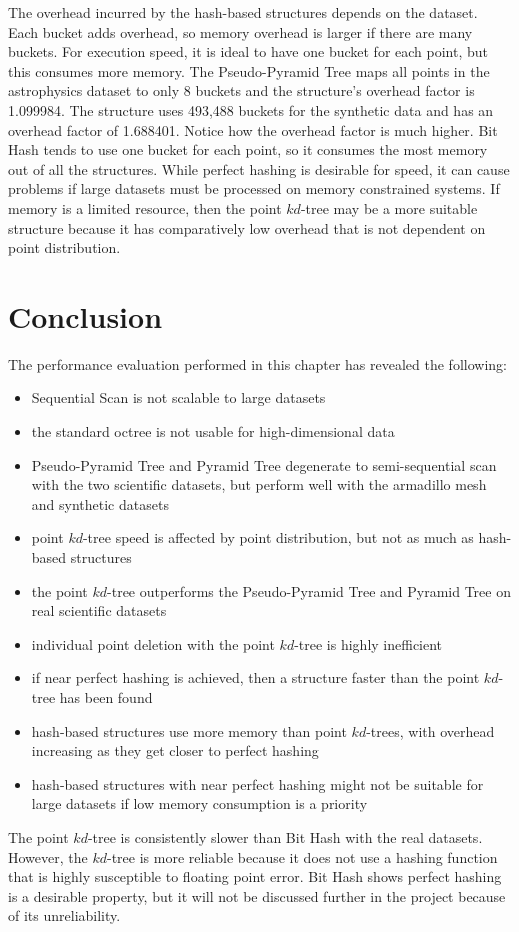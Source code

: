 The overhead incurred by the hash-based structures depends on the dataset. Each bucket adds overhead, so memory overhead is larger if there are many buckets. For execution speed, it is ideal to have one bucket for each point, but this consumes more memory. The Pseudo-Pyramid Tree maps all points in the astrophysics dataset to only 8 buckets and the structure's overhead factor is 1.099984. The structure uses 493,488 buckets for the synthetic data and has an overhead factor of 1.688401. Notice how the overhead factor is much higher. Bit Hash tends to use one bucket for each point, so it consumes the most memory out of all the structures. While perfect hashing is desirable for speed, it can cause problems if large datasets must be processed on memory constrained systems. If memory is a limited resource, then the point $kd$-tree may be a more suitable structure because it has comparatively low overhead that is not dependent on point distribution.

\section{Conclusion}

The performance evaluation performed in this chapter has revealed the following:
\begin{itemize}
	\item Sequential Scan is not scalable to large datasets
	\item the standard octree is not usable for high-dimensional data
	\item Pseudo-Pyramid Tree and Pyramid Tree degenerate to semi-sequential scan with the two scientific datasets, but perform well with the armadillo mesh and synthetic datasets
	\item point $kd$-tree speed is affected by point distribution, but not as much as hash-based structures
	\item the point $kd$-tree outperforms the Pseudo-Pyramid Tree and Pyramid Tree on real scientific datasets
	\item individual point deletion with the point $kd$-tree is highly inefficient
	\item if near perfect hashing is achieved, then a structure faster than the point $kd$-tree has been found
	\item hash-based structures use more memory than point $kd$-trees, with overhead increasing as they get closer to perfect hashing
	\item hash-based structures with near perfect hashing might not be suitable for large datasets if low memory consumption is a priority
\end{itemize}

The point $kd$-tree is consistently slower than Bit Hash with the real datasets. However, the $kd$-tree is more reliable because it does not use a hashing function that is highly susceptible to floating point error. Bit Hash shows perfect hashing is a desirable property, but it will not be discussed further in the project because of its unreliability.